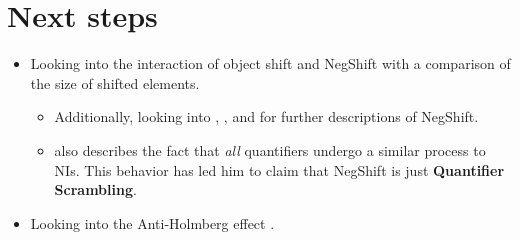 \documentclass[12pt, letterpaper]{article}
\begin{document}
\section{Next steps} \label{sec:NEXT}
\begin{itemize}
	\item Looking into the interaction of object shift and NegShift with a comparison of the size of shifted elements.
	\begin{itemize}
		\item Additionally, looking into \citet{christensenInterfacesNegationSyntax2005}, \citet{viknerObjectShiftScandinavian2017,viknerVerbMovementVariation2001}, and \citet{thrainssonSyntaxIcelandic2010} for further descriptions of NegShift.
		\item \citeauthor{thrainssonSyntaxIcelandic2010} also describes the fact that \emph{all} quantifiers undergo a similar process to NIs. This behavior has led him to claim that NegShift is just \textbf{Quantifier Scrambling}.
	\end{itemize}
	\item Looking into the Anti-Holmberg effect \citep{foxCyclicLinearizationSyntactic2005,engelsScandinavianNegativeIndefinites2012}.
\end{itemize}



\printbibliography
\end{document}
